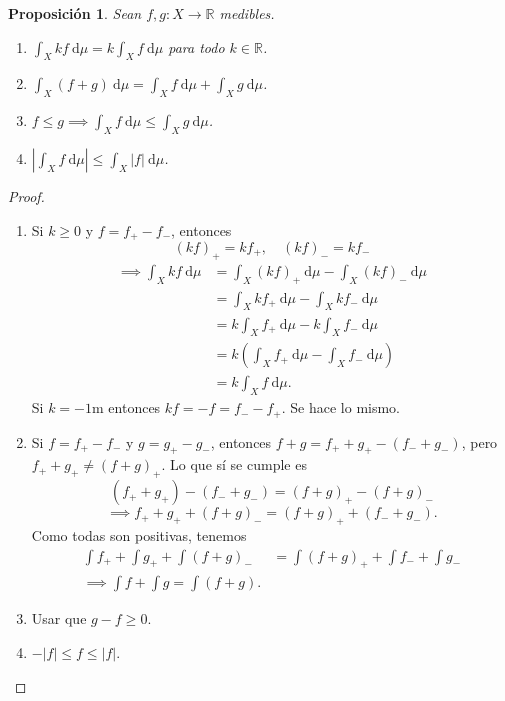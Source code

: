 \documentclass{article}
\newtheorem{proposition}[theorem]{Proposición}
\theoremstyle{definition}
\theoremstyle{remark}
\numberwithin{equation}{section}
\newcommand{\R}{\mathbb{R}}
\newcommand{\abs}[1]{\left| #1 \right|}
\newcommand{\br}[1]{\left( #1 \right)}
\newcommand{\ds}{\displaystyle}
\begin{document}
\begin{proposition}
  Sean $f,g \colon X \to \R$ medibles. 
  \begin{enumerate}[(1)]
    \item $\ds \int_X k f \ \mathrm{d}\mu = k \int_X f \ \mathrm{d}\mu$ para todo $k \in \R$.
    \item $\ds \int_X (f+g) \ \mathrm{d}\mu = \int_X f \ \mathrm{d}\mu + \int_X g \ \mathrm{d}\mu$.
    \item $\ds f \leq g \implies \int_X f \ \mathrm{d}\mu \leq \int_X g \ \mathrm{d}\mu$.
    \item $\ds \abs{\int_X f \ \mathrm{d}\mu} \leq \int_X \abs f \ \mathrm{d}\mu$.
  \end{enumerate}
\end{proposition}
\begin{proof}
  \ 
  \begin{enumerate}[(1)]
    \item Si $k \geq 0$ y $f = f_+ - f_-$, entonces 
    \[ (kf)_+ = kf_+, \quad (kf)_- = kf_- \]
    \begin{align*}
        \implies \int_X kf \ \mathrm{d}\mu
        &= \int_X (kf)_+ \ \mathrm{d}\mu - \int_X (kf)_- \ \mathrm{d}\mu \\
        &= \int_X kf_+ \ \mathrm{d}\mu - \int_X kf_- \ \mathrm{d}\mu \\
        &= k \int_X f_+ \ \mathrm{d}\mu - k \int_X f_- \ \mathrm{d}\mu \\
        &= k \br{\int_X f_+ \ \mathrm{d}\mu - \int_X f_- \ \mathrm{d}\mu} \\
        &= k \int_X f \ \mathrm{d}\mu.
    \end{align*}
    Si $k = -1$m entonces $kf = -f = f_- - f_+$. Se hace lo mismo.
    
    \item Si $f = f_+ - f_-$ y $g = g_+ - g_-$, entonces $f+g = f_+ + g_+ - (f_- + g_-)$, pero $f_+ + g_+ \neq (f+g)_+$. Lo que sí se cumple es 
    \[ (f_+ + g_+) - (f_- + g_-) = (f+g)_+ - (f+g)_- \]
    \[ \implies f_+ + g_+ + (f+g)_- = (f+g)_+ + (f_- + g_-). \]
    Como todas son positivas, tenemos 
    \begin{align*}
        \int f_+ + \int g_+ + \int (f+g)_-
        &= \int (f+g)_+ + \int f_- + \int g_- \\
        \implies \int f + \int g = \int (f+g).
    \end{align*}
    \item Usar que $g-f \geq 0$.
    \item $-\abs f \leq f \leq \abs f$.
  \end{enumerate}
\end{proof}
\end{document}
